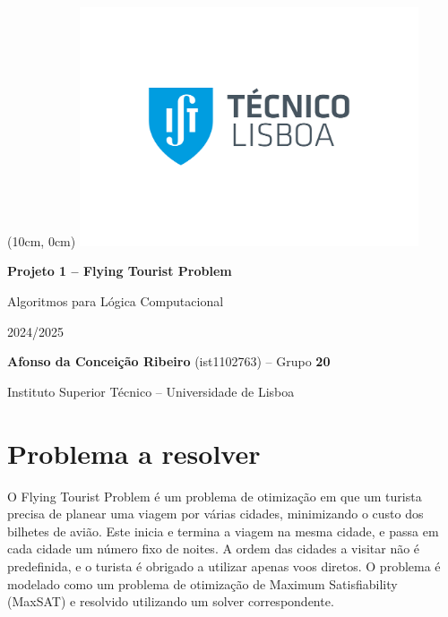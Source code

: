 \documentclass[12pt,a4paper]{article}
\newcommand{\reporttitle}{Projeto 1 -- Flying Tourist Problem}
\newcommand{\authorname}{Afonso da Conceição Ribeiro}
\newcommand{\authorid}{ist1102763}
\newcommand{\authorgroup}{20}
\newcommand{\reportauthor}{\textbf{\authorname} (\authorid) -- Grupo \textbf{\authorgroup}}
\newcommand{\istul}{Instituto Superior Técnico -- Universidade de Lisboa}
\newcommand{\reportcourse}{Algoritmos para Lógica Computacional}
\newcommand{\reportyear}{2024/2025}
\begin{document}
    \begin{titlepage}

        \begin{textblock*}{0cm}(10cm, 0cm)
            \includegraphics[width=10cm]{Logo IST.jpg}
        \end{textblock*}

        \centering
        \vspace*{5cm}
        {\Huge \textbf{\reporttitle} \par}

        \vspace{0.5cm}
        {\LARGE \reportcourse \par}

        \vspace{0.5cm}
        {\large \reportyear \par}

        \vspace{2cm}
        {\large \reportauthor \par}
        
        \vspace{0.25cm}
        {\large \istul \par}

        \vfill
        \renewcommand{\contentsname}{Índice}
        \tableofcontents

        \thispagestyle{empty}
        \clearpage

    \end{titlepage}


    \setcounter{page}{2}
    \setlength{\parskip}{0em}


    \section{Problema a resolver}
        O Flying Tourist Problem é um problema de otimização em que um turista precisa de planear uma viagem por várias cidades, minimizando o custo dos bilhetes de avião. Este inicia e termina a viagem na mesma cidade, e passa em cada cidade um número fixo de noites. A ordem das cidades a visitar não é predefinida, e o turista é obrigado a utilizar apenas voos diretos. O problema é modelado como um problema de otimização de Maximum Satisfiability (MaxSAT) e resolvido utilizando um solver correspondente.
\end{document}

